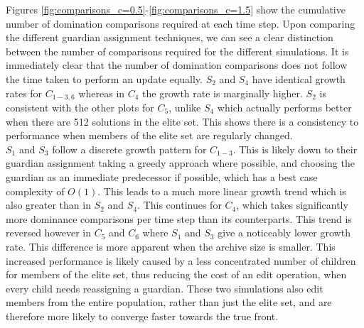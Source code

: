 \documentclass{ecmm427_assignment}
\begin{document}
Figures \ref{fig:comparisons_c=0.5}-\ref{fig:comparisons_c=1.5} show the cumulative number of domination comparisons required at each time step. Upon comparing the different guardian assignment techniques, we can see a clear distinction between the number of comparisons required for the different simulations. It is immediately clear that the number of domination comparisons does not follow the time taken to perform an update equally. $S_2$ and $S_4$ have identical growth rates for $C_{1-3,6}$ whereas in $C_4$ the growth rate is marginally higher. $S_2$ is consistent with the other plots for $C_5$, unlike $S_4$ which actually performs better when there are 512 solutions in the elite set. This shows there is a consistency to performance when members of the elite set are regularly changed.\\
$S_1$ and $S_3$ follow a discrete growth pattern for $C_{1-3}$. This is likely down to their guardian assignment taking a greedy approach where possible, and choosing the guardian as an immediate predecessor if possible, which has a best case complexity of $O(1)$. This leads to a much more linear growth trend which is also greater than in $S_2$ and $S_4$. This continues for $C_4$, which takes significantly more dominance comparisons per time step than its counterparts. This trend is reversed however in $C_5$ and $C_6$ where $S_1$ and $S_3$ give a noticeably lower growth rate. This difference is more apparent when the archive size is smaller. This increased performance is likely caused by a less concentrated number of children for members of the elite set, thus reducing the cost of an edit operation, when every child needs reassigning a guardian. These two simulations also edit members from the entire population, rather than just the elite set, and are therefore more likely to converge faster towards the true front.
\end{document}
